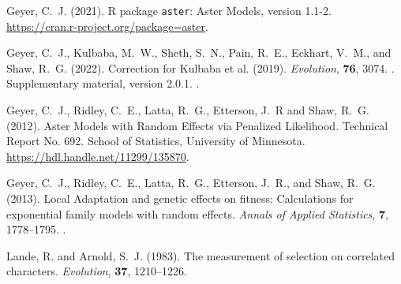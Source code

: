 \documentclass[11pt]{article}
\begin{document}
\begin{thebibliography}{}


Geyer, C.~J. (2021).
\newblock R package \texttt{aster}: Aster Models, version 1.1-2.
\newblock \url{https://cran.r-project.org/package=aster}.

Geyer, C.~J., Kulbaba, M.~W., Sheth, S.~N., Pain, R.~E., Eckhart, V.~M.,
    and Shaw, R.~G. (2022).
\newblock Correction for Kulbaba et al. (2019).
\newblock \emph{Evolution}, \textbf{76}, 3074.
\newblock {}.
\newblock Supplementary material, version 2.0.1.
\newblock {}.

Geyer, C.~J., Ridley, C.~E., Latta, R.~G., Etterson, J.~R and Shaw, R.~G.
    (2012).
\newblock Aster Models with Random Effects via Penalized Likelihood.
\newblock Technical Report No. 692.  School of Statistics,
    University of Minnesota.
\newblock \url{https://hdl.handle.net/11299/135870}.

Geyer, C.~J., Ridley, C.~E., Latta, R.~G., Etterson, J.~R., and Shaw, R.~G.
    (2013).
\newblock Local Adaptation and genetic effects on fitness: Calculations for
    exponential family models with random effects.
\newblock \emph{Annals of Applied Statistics}, \textbf{7}, 1778--1795.
\newblock {}.

Lande, R. and Arnold, S.~J. (1983).
\newblock The measurement of selection on correlated characters.
\newblock \emph{Evolution}, \textbf{37}, 1210--1226.


\end{thebibliography}
\end{document}
